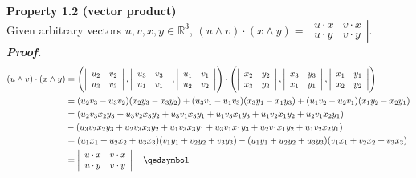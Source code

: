 \documentclass{article}
\begin{document}
\par
\textbf{Property 1.2 (vector product)}\\
Given arbitrary vectors $u, v, x, y \in \mathbb{R}^3$,
$(u \wedge v) \cdot (x \wedge y) = 
\left|\begin{array}{cc} 
    u \cdot x & v \cdot x \\ 
    u \cdot y & v \cdot y
\end{array}\right|$.\\
\textbf{\textit{Proof.}}\\
$$
\begin{aligned}
    (u \wedge v) \cdot (x \wedge y) &= 
    \Biggl(
    \left|\begin{array}{cc} 
        u_2 & v_2 \\ 
        u_3 & v_3
    \end{array}\right|,
    \left|\begin{array}{cc} 
        u_3 & v_3 \\ 
        u_1 & v_1
    \end{array}\right|,
    \left|\begin{array}{cc} 
        u_1 & v_1 \\ 
        u_2 & v_2
    \end{array}\right|
    \Biggr)
    \cdot
    \Biggl(
    \left|\begin{array}{cc} 
        x_2 & y_2 \\ 
        x_3 & y_3
    \end{array}\right|,
    \left|\begin{array}{cc} 
        x_3 & y_3 \\ 
        x_1 & y_1
    \end{array}\right|,
    \left|\begin{array}{cc} 
        x_1 & y_1 \\ 
        x_2 & y_2
    \end{array}\right|
    \Biggr)\\
    &=
    (u_2v_3-u_3v_2)(x_2y_3-x_3y_2) +
    (u_3v_1-u_1v_3)(x_3y_1-x_1y_3) +
    (u_1v_2-u_2v_1)(x_1y_2-x_2y_1)\\
    &=
    (u_2v_3x_2y_3 + u_3v_2x_3y_2 + u_3v_1x_3y_1 + u_1v_3x_1y_3 + u_1v_2x_1y_2 + u_2v_1x_2y_1)\\
    &-(u_3v_2x_2y_3 + u_2v_3x_3y_2 + u_1v_3x_3y_1 + u_3v_1x_1y_3 + u_2v_1x_1y_2 + u_1v_2x_2y_1)\\
    &= 
    (u_1x_1 + u_2x_2 + u_3x_3)(v_1y_1 + v_2y_2 + v_3y_3)-(u_1y_1 + u_2y_2 + u_3y_3)(v_1x_1 + v_2x_2 + v_3x_3)\\
    &=
    \left|\begin{array}{cc} 
        u \cdot x & v \cdot x \\ 
        u \cdot y & v \cdot y
    \end{array}\right| \quad \qedsymbol\\
\end{aligned}
$$
\end{document}
